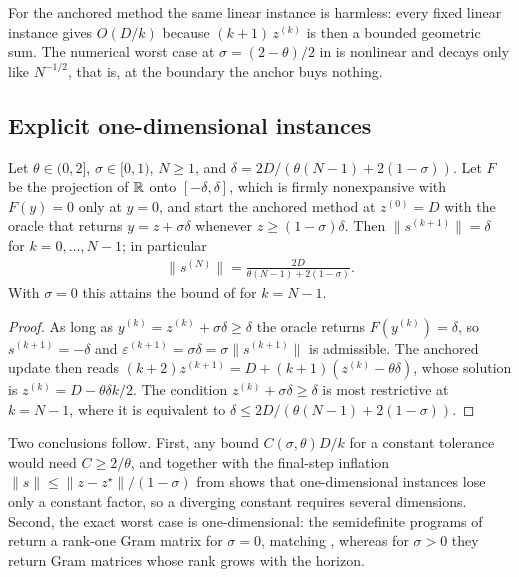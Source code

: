 For the anchored method the same linear instance is harmless: every fixed linear instance gives $O(D/k)$ because $(k+1)\, z^{(k)}$ is then a bounded geometric sum.
The numerical worst case at $\sigma = (2-\theta)/2$ in  is nonlinear and decays only like $N^{-1/2}$, that is, at the boundary the anchor buys nothing.

\subsection{Explicit one-dimensional instances}
\begin{proposition}\label{prop:acc-clip}
    Let $\theta \in (0,2]$, $\sigma \in [0,1)$, $N \ge 1$, and $\delta = 2D/(\theta(N-1) + 2(1-\sigma))$.
    Let $F$ be the projection of $\mathbb{R}$ onto $[-\delta, \delta]$, which is firmly nonexpansive with $F(y) = 0$ only at $y = 0$, and start the anchored method at $z^{(0)} = D$ with the oracle that returns $y = z + \sigma\delta$ whenever $z \ge (1-\sigma)\delta$.
    Then $\|s^{(k+1)}\| = \delta$ for $k = 0, \ldots, N-1$; in particular
    \begin{align}
        \|s^{(N)}\| = \frac{2D}{\theta(N-1) + 2(1-\sigma)} .
    \end{align}
    With $\sigma = 0$ this attains the bound of  for $k = N-1$.
\end{proposition}
\begin{proof}
    As long as $y^{(k)} = z^{(k)} + \sigma\delta \ge \delta$ the oracle returns $F(y^{(k)}) = \delta$, so $s^{(k+1)} = -\delta$ and $\varepsilon^{(k+1)} = \sigma\delta = \sigma\|s^{(k+1)}\|$ is admissible.
    The anchored update then reads $(k+2)z^{(k+1)} = D + (k+1)(z^{(k)} - \theta\delta)$, whose solution is $z^{(k)} = D - \theta\delta k/2$.
    The condition $z^{(k)} + \sigma\delta \ge \delta$ is most restrictive at $k = N-1$, where it is equivalent to $\delta \le 2D/(\theta(N-1) + 2(1-\sigma))$.
\end{proof}

Two conclusions follow.
First, any bound $C(\sigma,\theta)D/k$ for a constant tolerance would need $C \ge 2/\theta$, and  together with the final-step inflation $\|s\| \le \|z - z^\star\|/(1-\sigma)$ from  shows that one-dimensional instances lose only a constant factor, so a diverging constant requires several dimensions.
Second, the exact worst case is one-dimensional: the semidefinite programs of  return a rank-one Gram matrix for $\sigma = 0$, matching , whereas for $\sigma > 0$ they return Gram matrices whose rank grows with the horizon.


